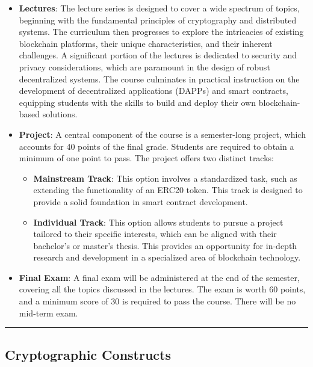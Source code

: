 \begin{itemize}
	\item
	\textbf{Lectures}: The lecture series is designed to cover a wide
	spectrum of topics, beginning with the fundamental principles of
	cryptography and distributed systems. The curriculum then progresses
	to explore the intricacies of existing blockchain platforms, their
	unique characteristics, and their inherent challenges. A significant
	portion of the lectures is dedicated to security and privacy
	considerations, which are paramount in the design of robust
	decentralized systems. The course culminates in practical instruction
	on the development of decentralized applications (DAPPs) and smart
	contracts, equipping students with the skills to build and deploy
	their own blockchain-based solutions.
	\item
	\textbf{Project}: A central component of the course is a semester-long
	project, which accounts for 40 points of the final grade. Students are
	required to obtain a minimum of one point to pass. The project offers
	two distinct tracks:
	
	\begin{itemize}
		\tightlist
		\item
		\textbf{Mainstream Track}: This option involves a standardized task,
		such as extending the functionality of an ERC20 token. This track is
		designed to provide a solid foundation in smart contract
		development.
		\item
		\textbf{Individual Track}: This option allows students to pursue a
		project tailored to their specific interests, which can be aligned
		with their bachelor's or master's thesis. This provides an
		opportunity for in-depth research and development in a specialized
		area of blockchain technology.
	\end{itemize}
	\item
	\textbf{Final Exam}: A final exam will be administered
	at the end of the semester, covering all the topics discussed in the
	lectures. The exam is worth 60 points, and a minimum score of 30 is
	required to pass the course. There will be no mid-term exam.
\end{itemize}

\begin{center}\rule{0.5\linewidth}{0.5pt}\end{center}

\subsection{Cryptographic
	Constructs}\label{section-2-cryptographic-constructs}

